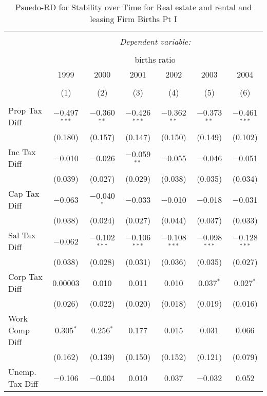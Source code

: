
\begin{table}[!htbp] \centering 
  \caption{Psuedo-RD for Stability over Time for  Real estate and rental and leasing Firm Births Pt I} 
  \label{53year} 
\small 
\begin{tabular}{@{\extracolsep{5pt}}lcccccc} 
\\[-1.8ex]\hline 
\hline \\[-1.8ex] 
 & \multicolumn{6}{c}{\textit{Dependent variable:}} \\ 
\cline{2-7} 
\\[-1.8ex] & \multicolumn{6}{c}{births ratio} \\ 
 & 1999 & 2000 & 2001 & 2002 & 2003 & 2004 \\ 
\\[-1.8ex] & (1) & (2) & (3) & (4) & (5) & (6)\\ 
\hline \\[-1.8ex] 
 Prop Tax Diff & $-$0.497$^{***}$ & $-$0.360$^{**}$ & $-$0.426$^{***}$ & $-$0.362$^{**}$ & $-$0.373$^{**}$ & $-$0.461$^{***}$ \\ 
  & (0.180) & (0.157) & (0.147) & (0.150) & (0.149) & (0.102) \\ 
  Inc Tax Diff & $-$0.010 & $-$0.026 & $-$0.059$^{**}$ & $-$0.055 & $-$0.046 & $-$0.051 \\ 
  & (0.039) & (0.027) & (0.029) & (0.038) & (0.035) & (0.034) \\ 
  Cap Tax Diff & $-$0.063 & $-$0.040$^{*}$ & $-$0.033 & $-$0.010 & $-$0.018 & $-$0.031 \\ 
  & (0.038) & (0.024) & (0.027) & (0.044) & (0.037) & (0.033) \\ 
  Sal Tax Diff & $-$0.062 & $-$0.102$^{***}$ & $-$0.106$^{***}$ & $-$0.108$^{***}$ & $-$0.098$^{***}$ & $-$0.128$^{***}$ \\ 
  & (0.038) & (0.028) & (0.031) & (0.036) & (0.035) & (0.027) \\ 
  Corp Tax Diff & 0.00003 & 0.010 & 0.011 & 0.010 & 0.037$^{*}$ & 0.027$^{*}$ \\ 
  & (0.026) & (0.022) & (0.020) & (0.018) & (0.019) & (0.016) \\ 
  Work Comp Diff & 0.305$^{*}$ & 0.256$^{*}$ & 0.177 & 0.015 & 0.031 & 0.066 \\ 
  & (0.162) & (0.139) & (0.150) & (0.152) & (0.121) & (0.079) \\ 
  Unemp. Tax Diff & $-$0.106 & $-$0.004 & 0.010 & 0.037 & $-$0.032 & 0.052 \\ 

\end{tabular}
\end{table}
